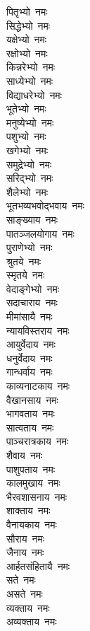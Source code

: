\begin{multicols}{2}
\begin{flushleft}
पितृभ्यो~नमः\\
सिद्धेभ्यो~नमः\\
यक्षेभ्यो~नमः\\
रक्षोभ्यो~नमः\\
किन्नरेभ्यो~नमः\\
साध्येभ्यो~नमः\\
विद्याधरेभ्यो~नमः\\
भूतेभ्यो~नमः\\
मनुष्येभ्यो~नमः\hfill{}\\
पशुभ्यो~नमः\\
खगेभ्यो~नमः\\
समुद्रेभ्यो~नमः\\
सरिद्भ्यो~नमः\\
शैलेभ्यो~नमः\\
भूतभव्यभवोद्भवाय~नमः\\
साङ्ख्याय~नमः\\
पातञ्जलयोगाय~नमः\\
पुराणेभ्यो~नमः\\
श्रुतये~नमः\hfill{}\\
स्मृतये~नमः\\
वेदाङ्गेभ्यो~नमः\\
सदाचाराय~नमः\\
मीमांसायै~नमः\\
न्यायविस्तराय~नमः\\
आयुर्वेदाय~नमः\\
धनुर्वेदाय~नमः\\
गान्धर्वाय~नमः\\
काव्यनाटकाय~नमः\\
वैखानसाय~नमः\hfill{}\\
भागवताय~नमः\\
सात्वताय~नमः\\
पाञ्चरात्रकाय~नमः\\
शैवाय~नमः\\
पाशुपताय~नमः\\
कालमुखाय~नमः\\
भैरवशासनाय~नमः\\
शाक्ताय~नमः\\
वैनायकाय~नमः\\
सौराय~नमः\hfill{}\\
जैनाय~नमः\\
आर्हतसंहितायै~नमः\\
सते~नमः\\
असते~नमः\\
व्यक्ताय~नमः\\
अव्यक्ताय~नमः\\

\end{flushleft}
\end{multicols}
